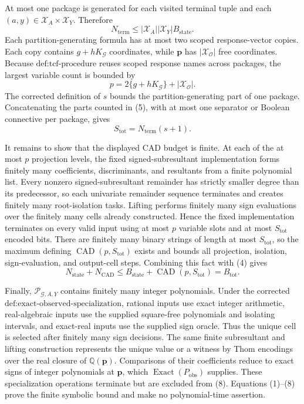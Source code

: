 At most one package is generated for each visited terminal tuple and each \((a,y)\in\mathcal X_A\times\mathcal X_Y\). Therefore
\[
N_{\mathrm{term}}
\leq |\mathcal X_A||\mathcal X_Y|B_{\mathrm{state}}.
\tag{5}
\]
Each partition-generating formula has at most two scoped response-vector copies. Each copy contains \(g+hK_{\mathcal G}\) coordinates, while \(\mathbf p\) has \(|\mathcal X_{\mathcal O}|\) free coordinates. Because \(\text{def:tcf-procedure}\) reuses scoped response names across packages, the largest variable count is bounded by
\[
p=2\{g+hK_{\mathcal G}\}+|\mathcal X_{\mathcal O}|.
\tag{6}
\]
The corrected definition of \(s\) bounds the partition-generating part of one package. Concatenating the parts counted in (5), with at most one separator or Boolean connective per package, gives
\[
S_{\mathrm{tot}}=N_{\mathrm{term}}(s+1).
\tag{7}
\]

It remains to show that the displayed CAD budget is finite. At each of the at most \(p\) projection levels, the fixed signed-subresultant implementation forms finitely many coefficients, discriminants, and resultants from a finite polynomial list. Every nonzero signed-subresultant remainder has strictly smaller degree than its predecessor, so each univariate remainder sequence terminates and creates finitely many root-isolation tasks. Lifting performs finitely many sign evaluations over the finitely many cells already constructed. Hence the fixed implementation terminates on every valid input using at most \(p\) variable slots and at most \(S_{\mathrm{tot}}\) encoded bits. There are finitely many binary strings of length at most \(S_{\mathrm{tot}}\), so the maximum defining \(\operatorname{CAD}(p,S_{\mathrm{tot}})\) exists and bounds all projection, isolation, sign-evaluation, and output-cell steps. Combining this fact with (4) gives
\[
N_{\mathrm{state}}+N_{\mathrm{CAD}}
\leq B_{\mathrm{state}}+\operatorname{CAD}(p,S_{\mathrm{tot}})
=B_{\mathrm{tot}}.
\tag{8}
\]

Finally, \(\mathscr P_{\mathcal G,A,Y}\) contains finitely many integer polynomials. Under the corrected \(\text{def:exact-observed-specialization}\), rational inputs use exact integer arithmetic, real-algebraic inputs use the supplied square-free polynomials and isolating intervals, and exact-real inputs use the supplied sign oracle. Thus the unique cell is selected after finitely many sign decisions. The same finite subresultant and lifting construction represents the unique value or a witness by Thom encodings over the real closure of \(\mathbb Q(\mathbf p)\). Comparisons of their coefficients reduce to exact signs of integer polynomials at \(\mathbf p\), which \(\operatorname{Exact}(P_{\mathrm{obs}})\) supplies. These specialization operations terminate but are excluded from (8). Equations (1)--(8) prove the finite symbolic bound and make no polynomial-time assertion.